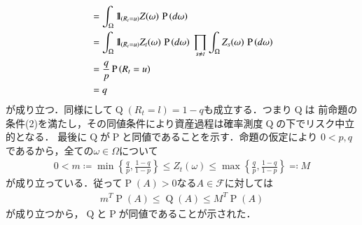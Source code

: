\begin{prf}
\begin{align}
		&= \int_{\Omega} \mbox{1}\hspace{-0.25em}\mbox{l}_{(R_t = u)} Z(\omega)\, \operatorname{P} \left(d\omega\right) \\
		&= \int_{\Omega} \mbox{1}\hspace{-0.25em}\mbox{l}_{(R_t = u)} Z_t(\omega)\, \operatorname{P} \left(d\omega\right)\ \prod_{s \neq t} \int_{\Omega} Z_s(\omega)\, \operatorname{P} \left(d\omega\right) \\
		&= \frac{q}{p}\operatorname{P} \left(R_t = u\right) \\
		&= q
	\end{align}
	が成り立つ．同様にして$\operatorname{Q}(R_t = l) = 1-q$も成立する．つまり$\operatorname{Q}$は
	前命題の条件(2)を満たし，その同値条件により資産過程は確率測度$\operatorname{Q}$の下でリスク中立的となる．
	最後に$\operatorname{Q}$が$\operatorname{P}$と同値であることを示す．命題の仮定により
	$0 < p,q$であるから，全ての$\omega \in \Omega$について
	\begin{align}
		0 < m \coloneqq \min{}{\left\{\tfrac{q}{p}, \tfrac{1-q}{1-p}\right\}}
		\leq Z_t(\omega) \leq \max{}{\left\{\tfrac{q}{p}, \tfrac{1-q}{1-p}\right\}} \eqqcolon M
	\end{align}
	が成り立っている．従って$\operatorname{P}(A) > 0$なる$A \in \mathscr{F}$に対しては
	\begin{align}
		m^T \operatorname{P}(A) \leq \operatorname{Q}(A) \leq M^T \operatorname{P}(A)
	\end{align}
	が成り立つから，$\operatorname{Q}$と$\operatorname{P}$が同値であることが示された．
	\QED
\end{prf}

